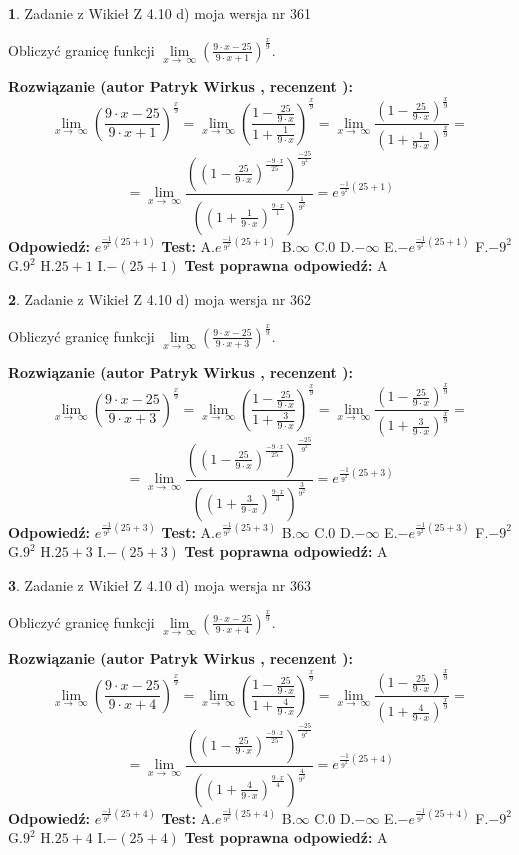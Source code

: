 \documentclass[12pt, a4paper]{article}
\theoremstyle{definition} %
\newtheorem{zad}{}
\newcommand{\zadStart}[1]{\begin{zad}#1\newline}
\newcommand{\zadStop}{\end{zad}}
\newcommand{\rozwStart}[2]{\noindent \textbf{Rozwiązanie (autor #1 , recenzent #2): }\newline}
\newcommand{\rozwStop}{\newline}
\newcommand{\odpStart}{\noindent \textbf{Odpowiedź:}\newline}
\newcommand{\odpStop}{\newline}
\newcommand{\testStart}{\noindent \textbf{Test:}\newline}
\newcommand{\testStop}{\newline}
\newcommand{\kluczStart}{\noindent \textbf{Test poprawna odpowiedź:}\newline}
\newcommand{\kluczStop}{\newline}
\begin{document}
\zadStart{Zadanie z Wikieł Z 4.10 d) moja wersja nr 361}


Obliczyć granicę funkcji  $\lim\limits_{x\to\ \infty}(\frac{9\cdot x-25}{9\cdot x+1})^{\frac{x}{9}}$.
\zadStop
\rozwStart{Patryk Wirkus}{}
$$\lim\limits_{x\to\ \infty}(\frac{9\cdot x-25}{9\cdot x+1})^{\frac{x}{9}} = \lim\limits_{x\to\ \infty}(\frac{1-\frac{25}{9\cdot x}}{1+\frac{1}{9\cdot x}})^{\frac{x}{9}}=\lim\limits_{x\to\ \infty}\frac{(1-\frac{25}{9\cdot x})^{\frac{x}{9}}}{(1+\frac{1}{9\cdot x})^{\frac{x}{9}}}=$$
$$=\lim\limits_{x\to\ \infty}\frac{((1-\frac{25}{9\cdot x})^{\frac{-9\cdot x}{25}})^{\frac{-25}{9^{2}}}}{((1+\frac{1}{9\cdot x})^{\frac{9\cdot x}{1}})^{\frac{1}{9^{2}}}}=e^{\frac{-1}{9^{2}}(25+1)}$$
\rozwStop
\odpStart
$e^{\frac{-1}{9^{2}}(25+1)}$
\odpStop
\testStart
A.$e^{\frac{-1}{9^{2}}(25+1)}$ B.$\infty$ C.$0$ D.$-\infty$ E.$-e^{\frac{-1}{9^{2}}(25+1)}$
F.$-9^{2}$ G.$9^{2}$
H.$25+1$
I.$-(25+1)$
\testStop
\kluczStart
A
\kluczStop



\zadStart{Zadanie z Wikieł Z 4.10 d) moja wersja nr 362}


Obliczyć granicę funkcji  $\lim\limits_{x\to\ \infty}(\frac{9\cdot x-25}{9\cdot x+3})^{\frac{x}{9}}$.
\zadStop
\rozwStart{Patryk Wirkus}{}
$$\lim\limits_{x\to\ \infty}(\frac{9\cdot x-25}{9\cdot x+3})^{\frac{x}{9}} = \lim\limits_{x\to\ \infty}(\frac{1-\frac{25}{9\cdot x}}{1+\frac{3}{9\cdot x}})^{\frac{x}{9}}=\lim\limits_{x\to\ \infty}\frac{(1-\frac{25}{9\cdot x})^{\frac{x}{9}}}{(1+\frac{3}{9\cdot x})^{\frac{x}{9}}}=$$
$$=\lim\limits_{x\to\ \infty}\frac{((1-\frac{25}{9\cdot x})^{\frac{-9\cdot x}{25}})^{\frac{-25}{9^{2}}}}{((1+\frac{3}{9\cdot x})^{\frac{9\cdot x}{3}})^{\frac{3}{9^{2}}}}=e^{\frac{-1}{9^{2}}(25+3)}$$
\rozwStop
\odpStart
$e^{\frac{-1}{9^{2}}(25+3)}$
\odpStop
\testStart
A.$e^{\frac{-1}{9^{2}}(25+3)}$ B.$\infty$ C.$0$ D.$-\infty$ E.$-e^{\frac{-1}{9^{2}}(25+3)}$
F.$-9^{2}$ G.$9^{2}$
H.$25+3$
I.$-(25+3)$
\testStop
\kluczStart
A
\kluczStop



\zadStart{Zadanie z Wikieł Z 4.10 d) moja wersja nr 363}


Obliczyć granicę funkcji  $\lim\limits_{x\to\ \infty}(\frac{9\cdot x-25}{9\cdot x+4})^{\frac{x}{9}}$.
\zadStop
\rozwStart{Patryk Wirkus}{}
$$\lim\limits_{x\to\ \infty}(\frac{9\cdot x-25}{9\cdot x+4})^{\frac{x}{9}} = \lim\limits_{x\to\ \infty}(\frac{1-\frac{25}{9\cdot x}}{1+\frac{4}{9\cdot x}})^{\frac{x}{9}}=\lim\limits_{x\to\ \infty}\frac{(1-\frac{25}{9\cdot x})^{\frac{x}{9}}}{(1+\frac{4}{9\cdot x})^{\frac{x}{9}}}=$$
$$=\lim\limits_{x\to\ \infty}\frac{((1-\frac{25}{9\cdot x})^{\frac{-9\cdot x}{25}})^{\frac{-25}{9^{2}}}}{((1+\frac{4}{9\cdot x})^{\frac{9\cdot x}{4}})^{\frac{4}{9^{2}}}}=e^{\frac{-1}{9^{2}}(25+4)}$$
\rozwStop
\odpStart
$e^{\frac{-1}{9^{2}}(25+4)}$
\odpStop
\testStart
A.$e^{\frac{-1}{9^{2}}(25+4)}$ B.$\infty$ C.$0$ D.$-\infty$ E.$-e^{\frac{-1}{9^{2}}(25+4)}$
F.$-9^{2}$ G.$9^{2}$
H.$25+4$
I.$-(25+4)$
\testStop
\kluczStart
A
\kluczStop
\end{document}
